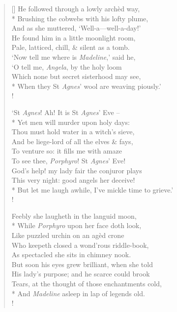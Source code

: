 \documentclass[MAIN]{subfiles}
\begin{document}
\begin{verse}[\versewidth]
\vin He followed through a lowly arch\`ed way,\\*
\vin Brushing the cobwebs with his lofty plume,\\
\vin And as she muttered, `Well-a—well-a-day!'\\
\vin He found him in a little moonlight room,\\
\vin Pale, latticed, chill, \& silent as a tomb.\\
\vin `Now tell me where is \emph{Madeline},' said he,\\
\vin `O tell me, \emph{Angela}, by the holy loom\\
\vin Which none but secret sisterhood may see,\\*
When they St \emph{Agnes}' wool are weaving piously.'\\!

\vin `St \emph{Agnes}! Ah! It is St \emph{Agnes}' Eve --\\*
\vin Yet men will murder upon holy days:\\
\vin Thou must hold water in a witch's sieve,\\
\vin And be liege-lord of all the elves \& fays,\\
\vin To venture so: it fills me with amaze\\
\vin To see thee, \emph{Porphyro}! St \emph{Agnes}' Eve!\\
\vin God's help! my lady fair the conjuror plays\\
\vin This very night: good angels her deceive!\\*
But let me laugh awhile, I've mickle time to grieve.'\\!

\vin Feebly she laugheth in the languid moon,\\*
\vin While \emph{Porphyro} upon her face doth look,\\
\vin Like puzzled urchin on an ag\`ed crone\\
\vin Who keepeth closed a wond'rous riddle-book,\\
\vin As spectacled she sits in chimney nook.\\
\vin But soon his eyes grew brilliant, when she told\\
\vin His lady's purpose; and he scarce could brook\\
\vin Tears, at the thought of those enchantments cold,\\*
And \emph{Madeline} asleep in lap of legends old.\\!


\end{verse}
\end{document}
